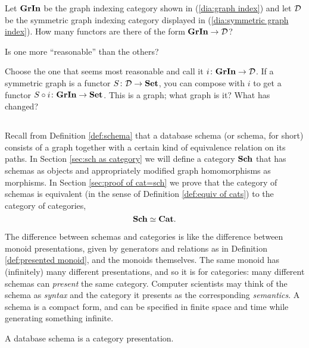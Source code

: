 \begin{exercise}
Let ${\bf GrIn}$ be the graph indexing category shown in (\ref{dia:graph index}) and let $\mathcal{D}$ be the symmetric graph indexing category displayed in (\ref{dia:symmetric graph index}).
\sexc How many functors are there of the form ${\bf GrIn}\rightarrow\mathcal{D}$?
\item Is one more “reasonable” than the others? 
\item Choose the one that seems most reasonable and call it $i\colon{\bf GrIn}\rightarrow\mathcal{D}$. If a symmetric graph is a functor $S\colon\mathcal{D}\rightarrow{\bf Set}$, you can compose with $i$ to get a functor $S\circ i\colon{\bf GrIn}\rightarrow{\bf Set}$. This is a graph; what graph is it? What has changed?
\endsexc
\end{exercise}


\subsection{}\label{sec:schemas and cats intro}

Recall from Definition \ref{def:schema} that a database schema (or schema, for short) consists of a graph together with a certain kind of equivalence relation on its paths. In Section \ref{sec:sch as category} we will define a category ${\bf Sch}$ that has schemas as objects and appropriately modified graph homomorphisms as morphisms. In Section \ref{sec:proof of cat=sch} we prove that the category of schemas is equivalent (in the sense of Definition \ref{def:equiv of cats}) to the category of categories, $${\bf Sch}\simeq{\bf Cat}.$$

The difference between schemas and categories is like the difference between monoid presentations, given by generators and relations as in Definition \ref{def:presented monoid}, and the monoids themselves. The same monoid has (infinitely) many different presentations, and so it is for categories: many different schemas can {\em present} the same category. Computer scientists may think of the schema as {\em syntax} and the category it presents as the corresponding {\em semantics}. A schema is a compact form, and can be specified in finite space and time while generating something infinite. 

\begin{slogan}
A database schema is a category presentation.
\end{slogan}

